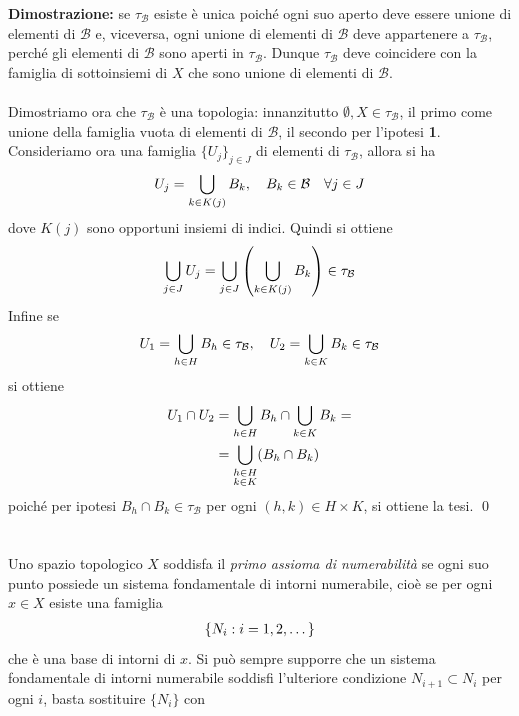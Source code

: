 \documentclass{article}
\begin{document}
\textbf{Dimostrazione:} se $\tau_\mathcal{B}$ esiste è unica poiché ogni suo aperto deve essere unione di elementi di $\mathcal{B}$ e, viceversa, ogni unione di elementi di $\mathcal{B}$ deve appartenere a $\tau_\mathcal{B}$, perché gli elementi di $\mathcal{B}$ sono aperti in $\tau_\mathcal{B}$. Dunque $\tau_\mathcal{B}$ deve coincidere con la famiglia di sottoinsiemi di $X$ che sono unione di elementi di $\mathcal{B}$. \\ \\
Dimostriamo ora che $\tau_\mathcal{B}$ è una topologia: innanzitutto $\emptyset, X \in \tau_\mathcal{B}$, il primo come unione della famiglia vuota di elementi di $\mathcal{B}$, il secondo per l'ipotesi \textbf{1}. Consideriamo ora una famiglia $\{ U_j \}_{j \in J}$ di elementi di $\tau_\mathcal{B}$, allora si ha
\begin{gather}
    U_j = \bigcup_{k \in K(j)} B_k, \quad B_k \in \mathcal{B} \quad \forall j \in J \notag
\end{gather}
dove $K(j)$ sono opportuni insiemi di indici. Quindi si ottiene
\begin{gather}
    \bigcup_{j \in J} U_j = \bigcup_{j \in J} \left( \bigcup_{k \in K(j)} B_k \right) \in \tau_\mathcal{B} \notag
\end{gather}
Infine se
\begin{gather}
    U_1 = \bigcup_{h \in H} B_h \in \tau_\mathcal{B}, \quad U_2 = \bigcup_{k \in K} B_k \in \tau_\mathcal{B} \notag
\end{gather}
si ottiene
\begin{align}
    U_1 \cap U_2 &= \bigcup_{h \in H} B_h \cap \bigcup_{k \in K} B_k = \notag \\
    &= \bigcup_{\substack{h \in H \\ k \in K}} (B_h \cap B_k) \notag
\end{align}
poiché per ipotesi $B_h \cap B_k \in \tau_\mathcal{B}$ per ogni $(h, k) \in H \times K$, si ottiene la tesi. \qed \\ \\ \\
Uno spazio topologico $X$ soddisfa il \textit{primo assioma di numerabilità} se ogni suo punto possiede un sistema fondamentale di intorni numerabile, cioè se per ogni $x \in X$ esiste una famiglia
\begin{gather}
    \{ N_i : i = 1, 2, \dots \} \notag
\end{gather}
che è una base di intorni di $x$. Si può sempre supporre che un sistema fondamentale di intorni numerabile soddisfi l'ulteriore condizione $N_{i + 1} \subset N_i$ per ogni $i$, basta sostituire $\{ N_i \}$ con
\end{document}
